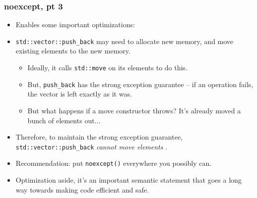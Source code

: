 \begin{frame}[fragile,t]
\frametitle{noexcept, pt 3}
\begin{itemize}[<+->]

\item Enables some important optimizations:

\item \texttt{std::vector::push\_back} may need to allocate new
  memory, and move existing elements to the new memory.
\begin{itemize}
  \item Ideally, it calls \texttt{std::move} on its elements to do
    this.
  \item But, \texttt{push\_back} has the strong exception guarantee --
    if an operation fails, the vector is left exactly as it was.
  \item But what happens if a move constructor throws?  It's already
    moved a bunch of elements out...
\end{itemize}
  \item Therefore, to maintain the strong exception guarantee,
    \texttt{std::vector::push\_back} \emph{cannot move elements} .

\vskip 6pt
\item Recommendation: put \texttt{noexcept()} everywhere you possibly
  can.
\item Optimization aside, it's an important semantic statement that
  goes a long way towards making code efficient and safe.

\end{itemize}
\end{frame}





